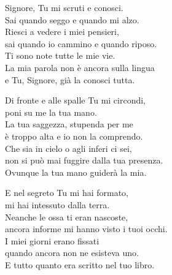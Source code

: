 
\strofa Signore, Tu mi scruti e conosci.\\
Sai quando seggo e quando mi alzo.\\
Riesci a vedere i miei pensieri,\\
sai quando io cammino e quando riposo.\\
Ti sono note tutte le mie vie.\\
La mia parola non è ancora sulla lingua\\
e Tu, Signore, già la conosci tutta.

\spazio


\spazio

\strofa Di fronte e alle spalle Tu mi circondi,\\
poni su me la tua mano.\\
La tua saggezza, stupenda per me\\
è troppo alta e io non la comprendo.\\
Che sia in cielo o agli inferi ci sei,\\
non si può mai fuggire dalla tua presenza.\\
Ovunque la tua mano guiderà la mia.

\spazio


\spazio

\strofa E nel segreto Tu mi hai formato,\\
mi hai intessuto dalla terra.\\
Neanche le ossa ti eran nascoste,\\
ancora informe mi hanno visto i tuoi occhi.\\
I miei giorni erano fissati\\
quando ancora non ne esisteva uno.\\
E tutto quanto era scritto nel tuo libro.

\spazio


\spazio

